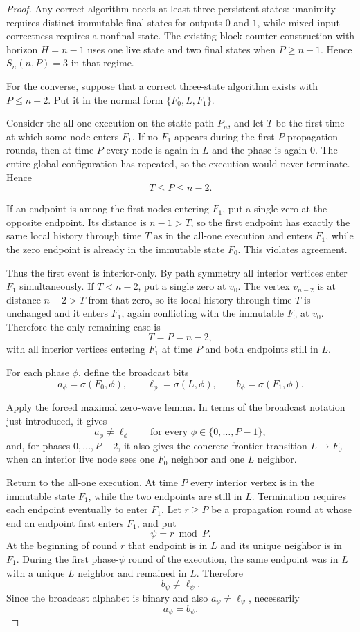 \documentclass[11pt]{article}
\theoremstyle{remark}
\newcommand{\Fzero}{F_0}
\newcommand{\Fone}{F_1}
\newcommand{\Live}{L}
\begin{document}
\begin{proof}
Any correct algorithm needs at least three persistent states: unanimity requires
distinct immutable final states for outputs $0$ and $1$, while mixed-input
correctness requires a nonfinal state.  The existing block-counter construction
with horizon $H=n-1$ uses one live state and two final states when $P\ge n-1$.
Hence $S_n(n,P)=3$ in that regime.

For the converse, suppose that a correct three-state algorithm exists with
$P\le n-2$.  Put it in the normal form
$\{\Fzero,\Live,\Fone\}$.

Consider the all-one execution on the static path $P_n$, and let $T$ be the first
time at which some node enters $\Fone$.  If no $\Fone$ appears during the first
$P$ propagation rounds, then at time $P$ every node is again in $\Live$ and the
phase is again $0$.  The entire global configuration has repeated, so the execution
would never terminate.  Hence
\[
T\le P\le n-2.
\]

If an endpoint is among the first nodes entering $\Fone$, put a single zero at the
opposite endpoint.  Its distance is $n-1>T$, so the first endpoint has exactly the
same local history through time $T$ as in the all-one execution and enters
$\Fone$, while the zero endpoint is already in the immutable state $\Fzero$.
This violates agreement.

Thus the first event is interior-only.  By path symmetry all interior vertices
enter $\Fone$ simultaneously.  If $T<n-2$, put a single zero at $v_0$.
The vertex $v_{n-2}$ is at distance $n-2>T$ from that zero, so its local history
through time $T$ is unchanged and it enters $\Fone$, again conflicting with the
immutable $\Fzero$ at $v_0$.  Therefore the only remaining case is
\[
T=P=n-2,
\]
with all interior vertices entering $\Fone$ at time $P$ and both endpoints still
in $\Live$.

For each phase $\phi$, define the broadcast bits
\[
a_\phi=\sigma(\Fzero,\phi),\qquad
\ell_\phi=\sigma(\Live,\phi),\qquad
b_\phi=\sigma(\Fone,\phi).
\]

Apply the forced maximal zero-wave lemma.  In terms of the broadcast
notation just introduced, it gives
\[
a_\phi\ne\ell_\phi
\qquad\text{for every }\phi\in\{0,\ldots,P-1\},
\]
and, for phases $0,\ldots,P-2$, it also gives the concrete frontier transition
$\Live\to\Fzero$ when an interior live node sees one $\Fzero$ neighbor and one
$\Live$ neighbor.

Return to the all-one execution.  At time $P$ every interior vertex is in the
immutable state $\Fone$, while the two endpoints are still in $\Live$.
Termination requires each endpoint eventually to enter $\Fone$.
Let $r\ge P$ be a propagation round at whose end an endpoint first enters
$\Fone$, and put
\[
\psi=r\bmod P.
\]
At the beginning of round $r$ that endpoint is in $\Live$ and its unique neighbor
is in $\Fone$.  During the first phase-$\psi$ round of the execution, the same
endpoint was in $\Live$ with a unique $\Live$ neighbor and remained in $\Live$.
Therefore
\[
b_\psi\ne\ell_\psi.
\]
Since the broadcast alphabet is binary and also
$a_\psi\ne\ell_\psi$, necessarily
\[
a_\psi=b_\psi.
\]


\end{proof}
\end{document}
